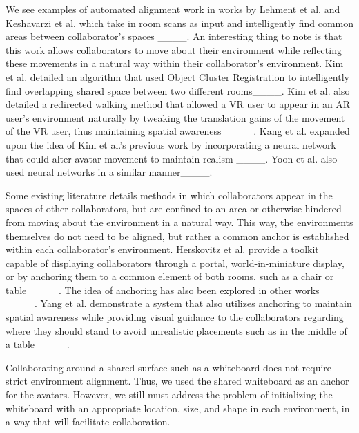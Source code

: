 We see examples of automated alignment work in works by Lehment et al. and Keshavarzi et al. which take in room scans as input and intelligently find common areas between collaborator's spaces ____. An interesting thing to note is that this work allows collaborators to move about their environment while reflecting these movements in a natural way within their collaborator's environment. Kim et al. detailed an algorithm that used Object Cluster Registration to intelligently find overlapping shared space between two different rooms____. Kim et al. also detailed a redirected walking method that allowed a VR user to appear in an AR user's environment naturally by tweaking the translation gains of the movement of the VR user, thus maintaining spatial awareness ____. Kang et al. expanded upon the idea of Kim et al.'s previous work by incorporating a neural network that could alter avatar movement to maintain realism ____. Yoon et al. also used neural networks in a similar manner____.  

Some existing literature details methods in which collaborators appear in the spaces of other collaborators, but are confined to an area or otherwise hindered from moving about the environment in a natural way. This way, the environments themselves do not need to be aligned, but rather a common anchor is established within each collaborator's environment. Herskovitz et al. provide a toolkit capable of displaying collaborators through a portal, world-in-miniature display, or by anchoring them to a common element of both rooms, such as a chair or table ____. The idea of anchoring has also been explored in other works ____. Yang et al. demonstrate a system that also utilizes anchoring to maintain spatial awareness while providing visual guidance to the collaborators regarding where they should stand to avoid unrealistic placements such as in the middle of a table ____.

Collaborating around a shared surface such as a whiteboard does not require strict environment alignment. Thus, we used the shared whiteboard as an anchor for the avatars. However, we still must address the problem of initializing the whiteboard with an appropriate location, size, and shape in each environment, in a way that will facilitate collaboration.